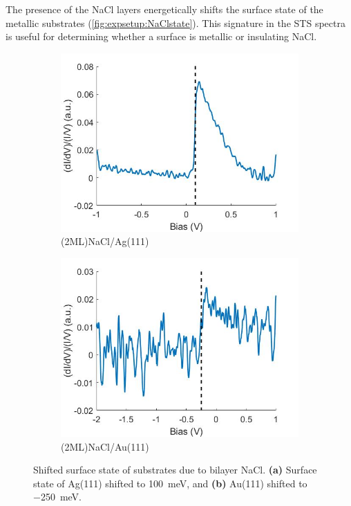 The presence of the NaCl layers energetically shifts the surface state of the metallic substrates (\autoref{fig:expsetup:NaClstate}). This signature in the \ac{STS} spectra is useful for determining whether a surface is metallic or insulating NaCl.

\begin{figure} [H]
    \centering
    \begin{subfigure}[t]{0.49\textwidth}
    \includegraphics[width=\textwidth]{pictures/2mlnacl_ag111_surface_state.jpg}
    \caption{(2ML)NaCl/Ag(111)}
    \end{subfigure}
    \hfill
    \begin{subfigure}[t]{0.49\textwidth}
    \includegraphics[width=\textwidth]{pictures/2mlnacl_au111_surface_state.jpg}
    \caption{(2ML)NaCl/Au(111)}
    \end{subfigure}
    
    \caption{Shifted surface state of substrates due to bilayer NaCl. \textbf{(a)} Surface state of Ag(111) shifted to \SI{+100}{meV}, and \textbf{(b)} Au(111) shifted to \SI{-250}{meV}.}
    \label{fig:expsetup:NaClstate}
\end{figure}

